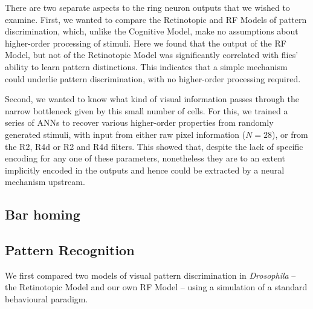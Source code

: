 
There are two separate aspects to the ring neuron outputs that we wished to examine.
First, we wanted to compare the Retinotopic and RF Models of pattern discrimination, which, unlike the Cognitive Model, make no assumptions about higher-order processing of stimuli.
Here we found that the output of the RF Model, but not of the Retinotopic Model was significantly correlated with flies' ability to learn pattern distinctions.
This indicates that a simple mechanism could underlie pattern discrimination, with no higher-order processing required.

Second, we wanted to know what kind of visual information passes through the narrow bottleneck given by this small number of cells.
For this, we trained a series of \acp{ANN} to recover various higher-order properties from randomly generated stimuli, with input from either raw pixel information ($N=28$), or from the R2, R4d or R2 and R4d filters.
This showed that, despite the lack of specific encoding for any one of these parameters, nonetheless they are to an extent implicitly encoded in the outputs and hence could be extracted by a neural mechanism upstream.

\subsection{Bar homing}

\subsection{Pattern Recognition}
We first compared two models of visual pattern discrimination in \emph{Drosophila} -- the Retinotopic Model \cite{Dill1995,Dill1993} and our own RF Model -- using a simulation of a standard behavioural paradigm.

